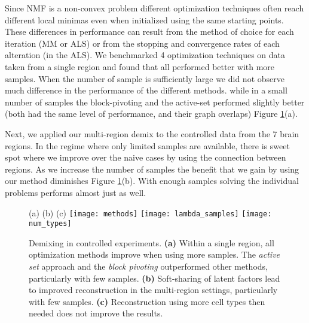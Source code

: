 


Since NMF is a non-convex problem different optimization techniques often reach different local minimas even when initialized using the same starting points. These differences in performance can result from the method of choice for each iteration (MM or ALS) or from the stopping and convergence rates of each alteration (in the ALS). We benchmarked 4 optimization techniques on data taken from a single region and found that all performed better with more samples. When the number of sample is sufficiently large we did not observe much difference in the performance of the different methods. while in a small number of samples the block-pivoting and the active-set performed slightly better (both had the same level of performance, and their graph overlaps) Figure \ref{fig:controlled_exp}(a).

Next, we applied our multi-region demix to the controlled data from the 7 brain regions.
In the regime where only limited samples are available, there is sweet spot where we improve over the naive cases by using the connection between regions. As we increase the number of samples the benefit that we gain by using our method diminishes Figure \ref{fig:controlled_exp}(b). With enough samples solving the individual problems performs almost just as well. 


\begin{figure}[!hbt]
   (a) \hspace{120pt}(b) \hspace{120pt}(c) \hspace{120pt}
   \centering
     \texttt{[image: methods]}
     \texttt{[image: lambda\_samples]}
     \texttt{[image: num\_types]}
    \caption{Demixing in controlled experiments. 
    {\bf{(a)}}  Within a single region, all optimization methods improve when using more samples. The {\em active set} approach and the {\em block pivoting} outperformed other methods, particularly with few samples. {\bf{(b)}} Soft-sharing of latent factors lead to improved reconstruction in the multi-region settings, particularly with few samples. {\bf{(c)}} Reconstruction using more cell types then needed does not improve the results.} 
    \label{fig:controlled_exp}
\end{figure}

